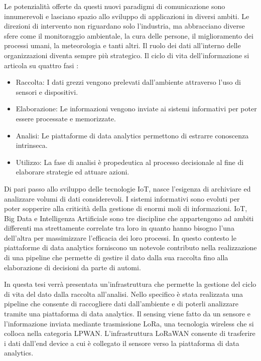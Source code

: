 \documentclass[12pt,a4paper,openright,twoside]{report}
\begin{document}
Le potenzialit\`a offerte da questi nuovi paradigmi di comunicazione sono innumerevoli e lasciano spazio allo sviluppo di applicazioni in diversi ambiti. Le direzioni di intervento non riguardano solo l'industria, ma abbracciano diverse sfere come il monitoraggio ambientale, la cura delle persone, il miglioramento dei processi umani, la meteorologia e tanti altri.
Il ruolo dei dati all'interno delle organizzazioni diventa sempre pi\`u strategico. Il ciclo di vita dell'informazione si articola  su quattro fasi \cite{K27}:
\begin{itemize}                       
\item Raccolta: I dati grezzi vengono prelevati dall'ambiente attraverso l'uso di sensori e dispositivi.
\item Elaborazione: Le informazioni vengono inviate ai sistemi informativi per poter essere processate e memorizzate.
\item Analisi: Le piattaforme di data analytics permettono di estrarre conoscenza intrinseca.
\item Utilizzo: La fase di analisi \`e propedeutica al processo decisionale al fine di elaborare strategie ed attuare azioni.
\end{itemize}

Di pari passo allo sviluppo delle tecnologie IoT, nasce l'esigenza di archiviare ed analizzare volumi di dati considerevoli. I sistemi informativi sono evoluti per poter sopperire alla criticit\`a della gestione di enormi moli di informazioni. 
IoT, Big Data e Intelligenza Artificiale sono tre discipline che appartengono ad ambiti differenti ma strettamente correlate tra loro in quanto hanno bisogno l'una dell'altra per massimizzare l'efficacia dei loro processi. 
In questo contesto le piattaforme di data analytics forniscono un notevole contributo nella realizzazione di una pipeline che permette di gestire il dato dalla sua raccolta fino alla elaborazione di decisioni da parte di automi.

In questa tesi verr\`a presentata un'infrastruttura che permette la gestione del ciclo di vita del dato dalla raccolta all'analisi. Nello specifico \`e stata realizzata una pipeline che consente di raccogliere dati dall'ambiente e di poterli analizzare tramite una piattaforma di data analytics.
Il sensing viene fatto da un sensore e l'informazione inviata mediante trasmissione LoRa, una tecnologia wireless che si colloca nella categoria LPWAN. L'infrastruttura LoRaWAN consente di trasferire i dati dall'end device a cui \`e collegato il sensore verso la piattaforma di data analytics.
\end{document}
